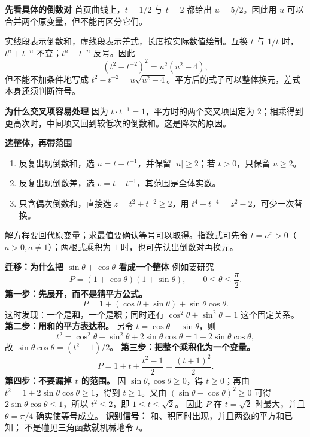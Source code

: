 \begin{explanationbox}
\textbf{\textcolor{CExplanation}{先看具体的倒数对}}
首页曲线上，$t=1/2$ 与 $t=2$ 都给出 $u=5/2$。因此用 $u$ 可以合并两个原变量，但不能再区分它们。

实线段表示倒数和，虚线段表示差式，长度按实际数值绘制。互换 $t$ 与 $1/t$ 时，$t^n+t^{-n}$ 不变；$t^n-t^{-n}$ 反号。因此
\[
(t^2-t^{-2})^2=u^2(u^2-4),
\]
但不能不加条件地写成 $t^2-t^{-2}=u\sqrt{u^2-4}$。平方后的式子可以整体换元，差式本身还须判断符号。

\medskip
\textbf{\textcolor{CExplanation}{为什么交叉项容易处理}}
因为 $t\cdot t^{-1}=1$，平方时的两个交叉项固定为 $2$；相乘得到更高次时，中间项又回到较低次的倒数和。这是降次的原因。

\medskip
\textbf{\textcolor{CExplanation}{选整体，再带范围}}
\begin{enumerate}[leftmargin=*,itemsep=0.55em]
\item 反复出现倒数和，选 $u=t+t^{-1}$，并保留 $|u|\ge2$；若 $t>0$，只保留 $u\ge2$。
\item 反复出现倒数差，选 $v=t-t^{-1}$，其范围是全体实数。
\item 只含偶次倒数和，直接选 $z=t^2+t^{-2}\ge2$，用 $t^4+t^{-4}=z^2-2$，可少一次替换。
\end{enumerate}
解方程要回代原变量；求最值要确认等号可以取得。指数式可先令 $t=a^x>0$（$a>0,a\ne1$）；两根式乘积为 $1$ 时，也可先认出倒数对再换元。

\medskip
\textbf{\textcolor{CExplanation}{迁移：为什么把 $\sin\theta+\cos\theta$ 看成一个整体}}
例如要研究
\[
P=(1+\cos\theta)(1+\sin\theta),\qquad 0\le\theta\le\frac\pi2.
\]
\textbf{第一步：先展开，而不是猜平方公式。}
\[
P=1+(\cos\theta+\sin\theta)+\sin\theta\cos\theta.
\]
这时发现：一个是\textbf{和}，一个是\textbf{积}；同时还有
$\cos^2\theta+\sin^2\theta=1$ 这个固定关系。
\textbf{第二步：用和的平方表达积。} 另令
$t=\cos\theta+\sin\theta$，则
\[
t^2=\cos^2\theta+\sin^2\theta+2\sin\theta\cos\theta
=1+2\sin\theta\cos\theta,
\]
故 $\sin\theta\cos\theta=(t^2-1)/2$。
\textbf{第三步：把整个乘积化为一个变量。}
\[
P=1+t+\frac{t^2-1}{2}=\frac{(t+1)^2}{2}.
\]
\textbf{第四步：不要漏掉 $t$ 的范围。}
因 $\sin\theta,\cos\theta\ge0$，得 $t\ge0$；再由 $t^2=1+2\sin\theta\cos\theta\ge1$，得到 $t\ge1$。又由
$(\sin\theta-\cos\theta)^2\ge0$ 可得
$2\sin\theta\cos\theta\le1$，所以 $t^2\le2$，即
$\boxed{1\le t\le\sqrt2}$。
因此 $P$ 在 $t=\sqrt2$ 时最大，并且 $\theta=\pi/4$ 确实使等号成立。
\textbf{识别信号：} 和、积同时出现，并且两数的平方和已知；
不是碰见三角函数就机械地令 $t$。

\end{explanationbox}
\clearpage

